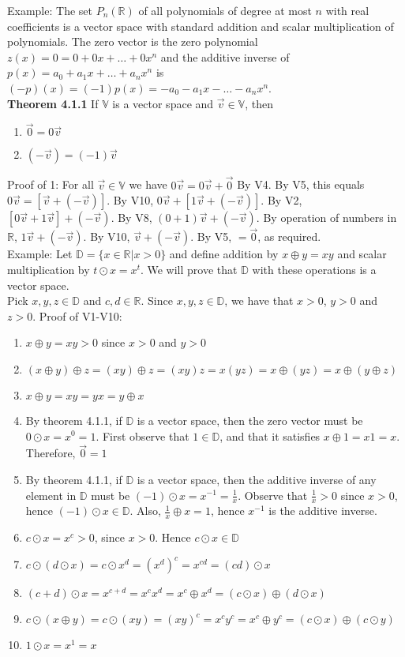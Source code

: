 \documentclass[10pt,letter]{article}
\begin{document}
Example: The set $P_n(\mathbb{R})$ of all polynomials of degree at most $n$ with real coefficients is a vector space with standard addition and scalar multiplication of polynomials. The zero vector is the zero polynomial $z(x)=0=0+0x+\ldots+0x^n$ and the additive inverse of $p(x)=a_0+a_1x+\ldots+a_nx^n$ is $(-p)(x)=(-1)p(x)=-a_0-a_1x-\ldots-a_nx^n$.  \\ 
\textbf{Theorem 4.1.1} If $\mathbb{V}$ is a vector space and $\vec{v}\in\mathbb{V}$, then \begin{enumerate}
    \item $\vec{0}=0\vec{v}$ 
    \item $(-\vec{v})=(-1)\vec{v}$ 
\end{enumerate}
Proof of 1: For all $\vec{v}\in\mathbb{V}$ we have $0\vec{v}=0\vec{v}+\vec{0}$ By V4. By V5, this equals $0\vec{v}=[\vec{v}+(-\vec{v})]$. By V10, $0\vec{v}+[1\vec{v}+(-\vec{v})]$. By V2, $[0\vec{v}+1\vec{v}]+(-\vec{v})$. By V8, $(0+1)\vec{v}+(-\vec{v})$. By operation of numbers in $\mathbb{R}$, $1\vec{v}+(-\vec{v})$. By V10, $\vec{v}+(-\vec{v})$. By V5, $=\vec{0}$, as required. \\ 
Example: Let $\mathbb{D}=\{x\in\mathbb{R}|x>0\}$ and define addition by $x\oplus y=xy$ and scalar multiplication by $t\odot x=x^t$. We will prove that $\mathbb{D}$ with these operations is a vector space. \\ 
Pick $x,y,z\in\mathbb{D}$ and $c,d\in\mathbb{R}$. Since $x,y,z\in\mathbb{D}$, we have that $x>0$, $y>0$ and $z>0$. Proof of V1-V10: \begin{enumerate}
    \item $x\oplus y=xy>0$ since $x>0$ and $y>0$ 
    \item $(x\oplus y)\oplus z=(xy)\oplus z=(xy)z=x(yz)=x\oplus(yz)=x\oplus(y\oplus z)$ 
    \item $x\oplus y=xy=yx=y\oplus x$ 
    \item By theorem 4.1.1, if $\mathbb{D}$ is a vector space, then the zero vector must be $0\odot x=x^0=1$. First observe that $1\in\mathbb{D}$, and that it satisfies $x\oplus 1=x1=x$. Therefore, $\vec{0}=1$ 
    \item By theorem 4.1.1, if $\mathbb{D}$ is a vector space, then the additive inverse of any element in $\mathbb{D}$ must be $(-1)\odot x=x^{-1}=\frac{1}{x}$. Observe that $\frac{1}{x}>0$ since $x>0$, hence $(-1)\odot x\in\mathbb{D}$. Also, $\frac{1}{x}\oplus x=1$, hence $x^{-1}$ is the additive inverse. 
    \item $c\odot x=x^c>0$, since $x>0$. Hence $c\odot x\in\mathbb{D}$ 
    \item $c\odot(d\odot x)=c\odot x^d = (x^d)^c=x^{cd}=(cd)\odot x$ 
    \item $(c+d)\odot x=x^{c+d}=x^cx^d=x^c\oplus x^d=(c\odot x)\oplus(d\odot x)$ 
    \item $c\odot (x\oplus y)=c\odot(xy)=(xy)^c=x^cy^c=x^c\oplus y^c=(c\odot x)\oplus(c\odot y)$ 
    \item $1\odot x=x^1=x$ 
\end{enumerate}
\end{document}
